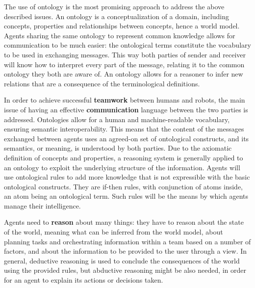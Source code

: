 The use of ontology is the most promising approach to address the above described issues. An ontology is a conceptualization of a domain, including concepts, properties and relationships between concepts, hence a world model. Agents sharing the same ontology to represent common knowledge allows for communication to be much easier: the ontological terms constitute
the vocabulary to be used in exchanging messages. This way both parties of sender and receiver will know how to interpret every part of the message, relating it to the common ontology they both are aware of. An ontology
allows for a reasoner to infer new relations that are a consequence of the terminological definitions.

In order to achieve successful \textbf{teamwork} between humans and robots, the main issue of having an effective \textbf{communication} language between the two parties is addressed. Ontologies allow for a human and machine-readable vocabulary, ensuring semantic interoperability. This means that the content of the messages exchanged between agents uses an agreed-on set of ontological constructs, and its semantics, or meaning, is understood by both parties. Due to the axiomatic definition of concepts and properties, a reasoning system is generally applied to an ontology to exploit the underlying structure of the information. Agents will use ontological rules to add more knowledge that is not expressible with the basic ontological constructs. They are if-then rules, with conjunction of atoms inside, an atom being an ontological term.
Such rules will be the means by which agents manage their intelligence. 

Agents need to \textbf{reason} about many things: they have to reason about the state of the world, meaning what can be inferred from the world model, about planning tasks and orchestrating information within a team based on a number of factors, and about the information to be provided to the user through a view. In general, deductive reasoning is used to conclude the consequences of the world using the provided rules, but abductive reasoning might be also needed, in order for an agent to explain its actions or decisions taken.

